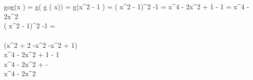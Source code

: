 \\

 \\

gog\left(x \right) = g\left( g \left( x\right)\right) = g\left(x^{2} - 1 \right) = \left( x^{2} - 1\right)^{2} -1 = x^{4} - 2x^{2} + 1 - 1 = x^{4} - 2x^{2} \\

 \Rightarrow  \left( x^{2} - 1\right)^{2} -1 =  \\

 \\

\left(x^{2 + 2} -x^{2} -x^{2} + 1\right)\\

x^{4} - 2x^{2} + 1 - 1\\

x^{4} - 2x^{2} +  - \\

x^{4} - 2x^{2}\\

